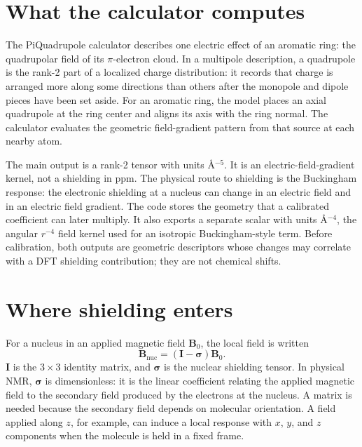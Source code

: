 \documentclass[11pt]{article}
\begin{document}

\section{What the calculator computes}

The PiQuadrupole calculator describes one electric effect of an aromatic
ring: the quadrupolar field of its \(\pi\)-electron cloud. In a multipole
description, a quadrupole is the rank-2 part of a localized charge
distribution: it records that charge is arranged more along some directions
than others after the monopole and dipole pieces have been set aside. For an
aromatic ring, the model places an axial quadrupole at the ring center and
aligns its axis with the ring normal. The calculator evaluates the geometric
field-gradient pattern from that source at each nearby atom.

The main output is a rank-2 tensor with units
\(\si{\angstrom^{-5}}\). It is an electric-field-gradient kernel, not a
shielding in ppm. The physical route to shielding is the Buckingham response:
the electronic shielding at a nucleus can change in an electric field and in
an electric field gradient. The code stores the geometry that a calibrated
coefficient can later multiply. It also exports a separate scalar with units
\(\si{\angstrom^{-4}}\), the angular \(r^{-4}\) field kernel used for an
isotropic Buckingham-style term. Before calibration, both outputs are
geometric descriptors whose changes may correlate with a DFT shielding
contribution; they are not chemical shifts.

\section{Where shielding enters}

For a nucleus in an applied magnetic field \(\bm B_0\), the local field is
written
\begin{equation}
  \bm B_{\mathrm{nuc}} = (\bm I-\bm\sigma)\bm B_0 .
  \label{eq:shielding}
\end{equation}
\(\bm I\) is the \(3\times3\) identity matrix, and \(\bm\sigma\) is the
nuclear shielding tensor. In physical NMR, \(\bm\sigma\) is dimensionless: it
is the linear coefficient relating the applied magnetic field to the secondary
field produced by the electrons at the nucleus. A matrix is needed because the
secondary field depends on molecular orientation. A field applied along
\(z\), for example, can induce a local response with \(x\), \(y\), and \(z\)
components when the molecule is held in a fixed frame.
\end{document}
